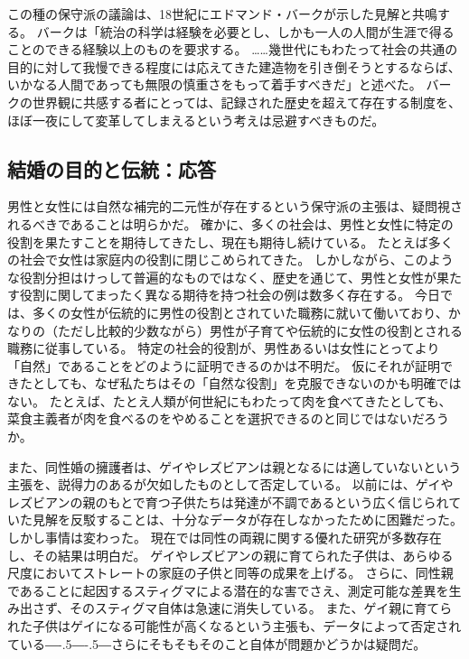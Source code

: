 \documentclass[paper=a4,book,openany]{jlreq}
\def\DDASH{―\kern-.5\zw―\kern-.5\zw―} %
\begin{document}
この種の保守派の議論は、18世紀にエドマンド・バークが示した見解と共鳴する。
バークは「統治の科学は経験を必要とし、しかも一人の人間が生涯で得ることのできる経験以上のものを要求する。
……幾世代にもわたって社会の共通の目的に対して我慢できる程度には応えてきた建造物を引き倒そうとするならば、いかなる人間であっても無限の慎重さをもって着手すべきだ」と述べた\citep[p.53]{burke87:_reflec_revol_franc}。
バークの世界観に共感する者にとっては、記録された歴史を超えて存在する制度を、ほぼ一夜にして変革してしまえるという考えは忌避すべきものだ。

\subsection{結婚の目的と伝統：応答}

男性と女性には自然な補完的二元性が存在するという保守派の主張は、疑問視されるべきであることは明らかだ。
確かに、多くの社会は、男性と女性に特定の役割を果たすことを期待してきたし、現在も期待し続けている。
たとえば多くの社会で女性は家庭内の役割に閉じこめられてきた。
しかしながら、このような役割分担はけっして普遍的なものではなく、歴史を通じて、男性と女性が果たす役割に関してまったく異なる期待を持つ社会の例は数多く存在する。
今日では、多くの女性が伝統的に男性の役割とされていた職務に就いて働いており、かなりの（ただし比較的少数ながら）男性が子育てや伝統的に女性の役割とされる職務に従事している。
特定の社会的役割が、男性あるいは女性にとってより「自然」であることをどのように証明できるのかは不明だ。
仮にそれが証明できたとしても、なぜ私たちはその「自然な役割」を克服できないのかも明確ではない。
たとえば、たとえ人類が何世紀にもわたって肉を食べてきたとしても、菜食主義者が肉を食べるのをやめることを選択できるのと同じではないだろうか。

また、同性婚の擁護者は、ゲイやレズビアンは親となるには適していないという主張を、説得力のあるが欠如したものとして否定している。
以前には、ゲイやレズビアンの親のもとで育つ子供たちは発達が不調であるという広く信じられていた見解を反駁することは、十分なデータが存在しなかったために困難だった。
しかし事情は変わった。
現在では同性の両親に関する優れた研究が多数存在し、その結果は明白だ。
ゲイやレズビアンの親に育てられた子供は、あらゆる尺度においてストレートの家庭の子供と同等の成果を上げる。
さらに、同性親であることに起因するスティグマによる潜在的な害でさえ、測定可能な差異を生み出さず、そのスティグマ自体は急速に消失している\citep{calzo17:_paren_sexual_orien_child_psych_well_being,biblarz10:_how_does_gender_paren_matter}。
また、ゲイ親に育てられた子供はゲイになる可能性が高くなるという主張も、データによって否定されている{\DDASH}さらにそもそもそのこと自体が問題かどうかは疑問だ。
\end{document}
